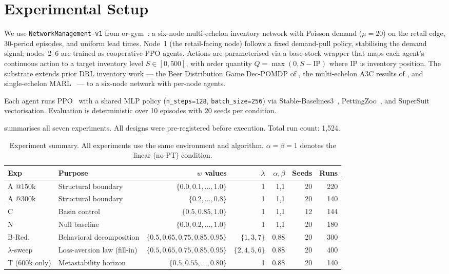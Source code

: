 \documentclass[letterpaper]{article}
\theoremstyle{plain}
\begin{document}
\section{Experimental Setup}
\label{sec:setup}

We use \texttt{NetworkManagement-v1} from or-gym~\citep{hubbs2020orgym}:
a six-node multi-echelon inventory network with Poisson demand
($\mu{=}20$) on the retail edge, 30-period episodes, and uniform lead
times.
Node~1 (the retail-facing node) follows a fixed demand-pull policy,
stabilising the demand signal; nodes~2--6 are trained as cooperative PPO
agents.
Actions are parameterised via a base-stock wrapper that maps each
agent's continuous action to a target inventory level $S \in [0, 500]$,
with order quantity $Q = \max(0, S - \mathrm{IP})$ where $\mathrm{IP}$
is inventory position.
The substrate extends prior DRL inventory work --- the Beer Distribution
Game Dec-POMDP of \citet{oroojlooyjadid2022}, the multi-echelon A3C
results of \citet{gijsbrechts2022}, and single-echelon
MARL~\citep{marlim2023} --- to a six-node network with per-node agents.

Each agent runs PPO~\citep{schulman2017ppo} with a shared MLP policy
(\texttt{n\_steps=128}, \texttt{batch\_size=256}) via
Stable-Baselines3~\citep{raffin2021sb3}, PettingZoo~\citep{terry2021pettingzoo},
and SuperSuit~\citep{terry2020supersuit} vectorisation.
Evaluation is deterministic over 10 episodes with 20 seeds per condition.

 summarises all seven experiments.
All designs were pre-registered before execution.
Total run count: 1,524.

\begin{table}[t]
\centering
\caption{Experiment summary. All experiments use the same environment and
algorithm.  $\alpha{=}\beta{=}1$ denotes the linear (no-PT) condition.}
\label{tab:experiments}
\small
\begin{tabular}{llrrrrr}
\toprule
Exp & Purpose & $w$ values & $\lambda$ & $\alpha,\beta$ & Seeds & Runs \\
\midrule
A @150k  & Structural boundary  & $\{0.0, 0.1,\ldots, 1.0\}$ & 1 & 1,1 & 20 & 220 \\
A @300k  & Structural boundary  & $\{0.2,\ldots, 0.8\}$       & 1 & 1,1 & 20 & 140 \\
C        & Basin control        & $\{0.5, 0.85, 1.0\}$        & 1 & 1,1 & 12 & 144 \\
N        & Null baseline        & $\{0.0, 0.2,\ldots, 1.0\}$  & 1 & 1,1 & 20 & 180 \\
B-Red.   & Behavioral decomposition & $\{0.5, 0.65, 0.75, 0.85, 0.95\}$ & $\{1,3,7\}$ & 0.88 & 20 & 300 \\
$\lambda$-sweep & Loss-aversion law (fill-in) & $\{0.5, 0.65, 0.75, 0.85, 0.95\}$ & $\{2,4,5,6\}$ & 0.88 & 20 & 400 \\
T (600k only) & Metastability horizon & $\{0.5, 0.55,\ldots, 0.80\}$ & 1 & 0.88 & 20 & 140 \\
\bottomrule
\end{tabular}
\end{table}
\end{document}
